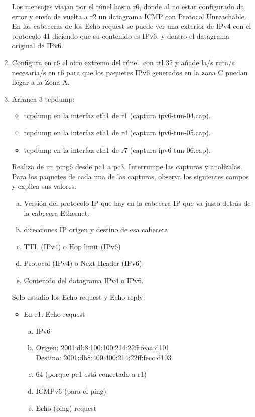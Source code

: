 \documentclass[12pt, a4paper]{report}
\begin{document}
\begin{enumerate}
	Los mensajes viajan por el túnel hasta r6, donde al no estar configurado da error y envía de vuelta a r2 un datagrama ICMP con Protocol Unreachable.\\
	En las cabeceras de los Echo request se puede ver una exterior de IPv4 con el protocolo 41 diciendo que su contenido es IPv6, y dentro el datagrama original de IPv6.
	\item Configura en r6 el otro extremo del túnel, con ttl 32 y añade la/s ruta/s necesaria/s en r6
	para que los paquetes IPv6 generados en la zona C puedan llegar a la Zona A.
	\item Arranca 3 tcpdump:
	\begin{itemize}
		\item tcpdump en la interfaz eth1 de r1 (captura ipv6-tun-04.cap).
		\item tcpdump en la interfaz eth1 de r4 (captura ipv6-tun-05.cap).
		\item tcpdump en la interfaz eth1 de r7 (captura ipv6-tun-06.cap).
	\end{itemize}
	Realiza de un ping6 desde pc1 a pc3. Interrumpe las capturas y analízalas. Para los paquetes
	de cada una de las capturas, observa los siguientes campos y explica sus valores:
	\begin{enumerate}[a)]
		\item Versión del protocolo IP que hay en la cabecera IP que va justo detrás de la cabecera
		Ethernet.
		\item direcciones IP origen y destino de esa cabecera
		\item TTL (IPv4) o Hop limit (IPv6)
		\item Protocol (IPv4) o Next Header (IPv6)
		\item Contenido del datagrama IPv4 o IPv6.
	\end{enumerate}
	Solo estudio los Echo request y Echo reply:
	\begin{itemize}
		\item En r1: Echo request
		\begin{enumerate}[a)]
			\item IPv6
			\item Origen: 2001:db8:100:100:214:22ff:feaa:d101\\
			Destino: 2001:db8:400:400:214:22ff:fecc:d103
			\item 64 (porque pc1 está conectado a r1)
			\item ICMPv6 (para el ping)
			\item Echo (ping) request
		\end{enumerate}

\end{itemize}
\end{enumerate}
\end{document}
